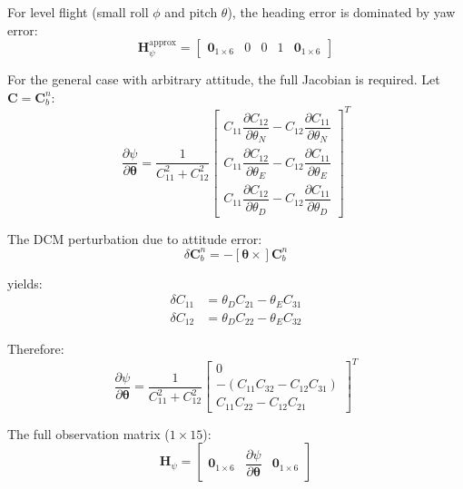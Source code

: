 \documentclass[11pt,a4paper]{article}
\newcommand{\mat}[1]{\mathbf{#1}}
\newcommand{\vect}[1]{\boldsymbol{#1}}
\newcommand{\skewmat}[1]{\left[#1 \times\right]}
\begin{document}
For level flight (small roll $\phi$ and pitch $\theta$), the heading error is dominated by yaw error:
\begin{equation}
    \mat{H}_{\psi}^{\text{approx}} = \begin{bmatrix}
        \mat{0}_{1\times6} & 0 & 0 & 1 & \mat{0}_{1\times6}
    \end{bmatrix}
\end{equation}

For the general case with arbitrary attitude, the full Jacobian is required. Let $\mat{C} = \mat{C}_b^n$:
\begin{equation}
    \frac{\partial \psi}{\partial \vect{\theta}} = \frac{1}{C_{11}^2 + C_{12}^2} \begin{bmatrix}
        C_{11}\dfrac{\partial C_{12}}{\partial \theta_N} - C_{12}\dfrac{\partial C_{11}}{\partial \theta_N} \\[1em]
        C_{11}\dfrac{\partial C_{12}}{\partial \theta_E} - C_{12}\dfrac{\partial C_{11}}{\partial \theta_E} \\[1em]
        C_{11}\dfrac{\partial C_{12}}{\partial \theta_D} - C_{12}\dfrac{\partial C_{11}}{\partial \theta_D}
    \end{bmatrix}^T
\end{equation}

The DCM perturbation due to attitude error:
\begin{equation}
    \delta\mat{C}_b^n = -\skewmat{\vect{\theta}}\mat{C}_b^n
\end{equation}

yields:
\begin{align}
    \delta C_{11} &= \theta_D C_{21} - \theta_E C_{31} \\
    \delta C_{12} &= \theta_D C_{22} - \theta_E C_{32}
\end{align}

Therefore:
\begin{equation}
    \frac{\partial \psi}{\partial \vect{\theta}} = \frac{1}{C_{11}^2 + C_{12}^2} \begin{bmatrix}
        0 \\
        -(C_{11}C_{32} - C_{12}C_{31}) \\
        C_{11}C_{22} - C_{12}C_{21}
    \end{bmatrix}^T
\end{equation}

The full observation matrix ($1 \times 15$):
\begin{equation}
    \mat{H}_{\psi} = \begin{bmatrix}
        \mat{0}_{1\times6} & \dfrac{\partial \psi}{\partial \vect{\theta}} & \mat{0}_{1\times6}
    \end{bmatrix}
    \label{eq:H_mag}
\end{equation}
\end{document}
